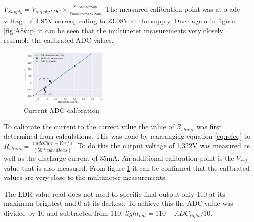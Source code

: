 $V_{Supply} = V_{supplyADC} \times \frac{V_{measuredSup}}{V_{measuredADCSup}}$. The measured calibration point was at a adc voltage of 4.85V corresponding to 23.08V at the supply. Once again in figure \ref{fig:A8sup} it can be seen that the multimeter measurements very closely resemble the calibrated ADC values.


\begin{figure}
	\begin{center}
		\includegraphics[width=0.38\textwidth]{./Figures/A8/currentA8.png}
	\end{center}
	\caption{Current ADC calibration}
	\label{fig:A8curr}
\end{figure}

To calibrate the current to the correct value the value of $R_{shunt}$ was first determined from calculations. This was done by rearranging equation \ref{eq:refeq} to $R_{shunt}= \frac{(adcCurr-Vref)}{(50*currMeas)}$. To do this the output voltage of 1.322V was measured as well as the discharge current of 85mA. An additional calibration point is the $V_{ref}$ value that is also measured. From figure \ref{fig:A8curr} it can be confirmed that the calibrated values are very close to the multimeter measurements.

The LDR value read does not need to specific final output only 100 at its maximum brightest and 0 at its darkest. To achieve this the ADC value was divided by 10 and subtracted from 110. $light_{out}=110-ADC_{light}/10$.
